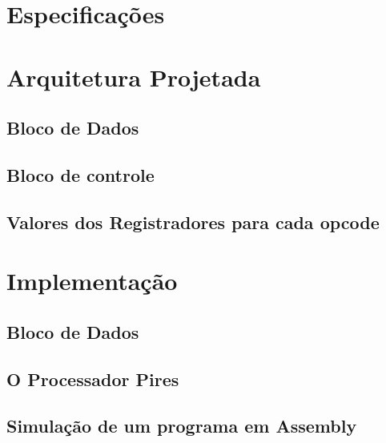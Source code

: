 \documentclass[a4paper]{ufscThesis}
\begin{document}
\def\PC{\textbf{PC}}
\def\A{\textbf{A}}
\def\B{\textbf{B}}
\def\IR{\textbf{IR}}

\capa
{} %

\chapter{Especificações}
	
\chapter{Arquitetura Projetada}
		
	\section{Bloco de Dados}
		
	\section{Bloco de controle}
		
	\section{Valores dos Registradores para cada opcode}
		
\chapter{Implementação}
	\section{Bloco de Dados}
		
	
	\section{O Processador Pires}
	\label{sec:processador_real}
		
	
	\section{Simulação de um programa em Assembly}
	\label{sec:simulacao}
		
\end{document}
